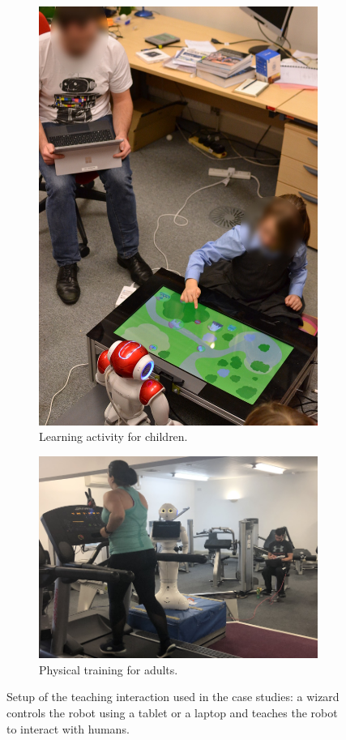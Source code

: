 \documentclass[manuscript, review, anonymous]{acmart}
\begin{document}
\begin{figure} \centering
    \begin{subfigure}[b]{0.4\columnwidth}
		\centering
    \includegraphics[width=.7\columnwidth]{figs/blured.JPG}
		\caption{Learning activity for children.}
	\end{subfigure}
    \begin{subfigure}[b]{0.58\columnwidth}
		\centering 
    \includegraphics[width=1\columnwidth]{figs/study2.png} 
		\caption{Physical training for adults.\newline}
	\end{subfigure} 
    \caption{Setup of the teaching interaction 
    used in the case studies: a wizard controls the robot using a tablet or a laptop and teaches the 
    robot to interact with humans.} \label{fig:setup}
\end{figure}
\end{document}
